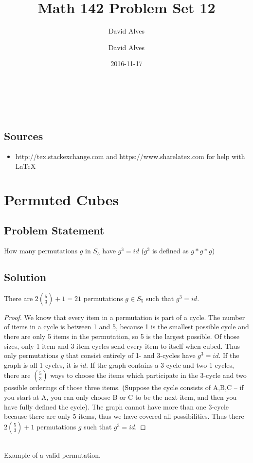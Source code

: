 \documentclass[12pt]{article}
\author{David Alves}
\title{Math 142 Problem Set 12}
\author{David Alves}
\date{2016-11-17}
\newcommand{\ProblemStatement}[1]{
\subsection*{Problem Statement}
#1
\subsection*{Solution}
}
\begin{document}

\begin{center}
\large \thetitle \\
\theauthor \\
\thedate
\end{center}

\subsection*{Sources}

    \begin{itemize}
    \item http://tex.stackexchange.com and https://www.sharelatex.com for help with \LaTeX
    \end{itemize}

\section{Permuted Cubes}
\ProblemStatement{
How many permutations $g$ in $S_5$ have $g^3 = id$ ($g^3$ is defined as $g*g*g$)
}

There are $2\binom{5}{3} + 1 = 21$ permutations $g \in S_5$ such that $g^3 = id$.
\begin{proof}
We know that every item in a permutation is part of a cycle. The number of items in a cycle is between 1 and 5, because 1 is the smallest possible cycle and there are only 5 items in the permutation, so 5 is the largest possible. Of those sizes, only 1-item and 3-item cycles send every item to itself when cubed. Thus only permutations $g$ that consist entirely of 1- and 3-cycles have $g^3=id$. If the graph is all 1-cycles, it is $id$. If the graph contains a 3-cycle and two 1-cycles, there are $\binom{5}{3}$ ways to choose the items which participate in the 3-cycle and two possible orderings of those three items. (Suppose the cycle consists of A,B,C -- if you start at A, you can only choose B or C to be the next item, and then you have fully defined the cycle). The graph cannot have more than one 3-cycle because there are only 5 items, thus we have covered all possibilities. Thus there $2\binom{5}{3} + 1$ permutations $g$ such that $g^3=id$.
\end{proof}
\begin{center}
\\Example of a valid permutation.
\end{center}
\end{document}
